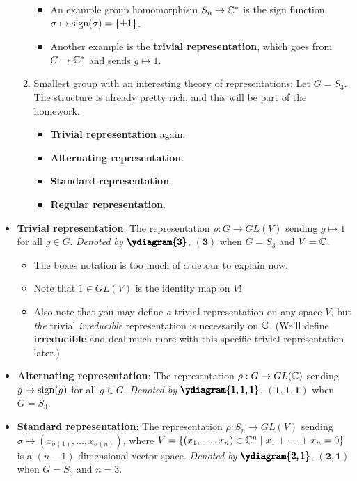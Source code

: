 \documentclass[../notes.tex]{subfiles}
\begin{document}
\begin{itemize}
\begin{enumerate}
\begin{itemize}
            \item An example group homomorphism $S_n\to\mathbb{C}^*$ is the sign function $\sigma\mapsto\operatorname{sign}(\sigma)=\{\pm 1\}$.
            \item Another example is the \textbf{trivial representation}, which goes from $G\to\mathbb{C}^*$ and sends $g\mapsto 1$.
        \end{itemize}
        \item Smallest group with an interesting theory of representations: Let $G=S_3$. The structure is already pretty rich, and this will be part of the homework.
        \begin{itemize}
            \item \textbf{Trivial representation} again.
            \item \textbf{Alternating representation}.
            \item \textbf{Standard representation}.
            \item \textbf{Regular representation}.
        \end{itemize}
    \end{enumerate}
    \item \textbf{Trivial representation}: The representation $\rho:G\to GL(V)$ sending $g\mapsto 1$ for all $g\in G$. \emph{Denoted by} $\pmb{\ydiagram{3}}$, $\bm{(3)}$ when $G=S_3$ and $V=\mathbb{C}$.
    \begin{itemize}
        \item The boxes notation is too much of a detour to explain now.
        \item Note that $1\in GL(V)$ is the identity map on $V$!
        \item Also note that you may define \emph{a} trivial representation on any space $V$, but \emph{the} trivial \emph{irreducible} representation is necessarily on $\mathbb{C}$. (We'll define \textbf{irreducible} and deal much more with this specific trivial representation later.)
    \end{itemize}
    \item \textbf{Alternating representation}: The representation $\rho:G\to GL(\mathbb{C})$ sending $g\mapsto\operatorname{sign}(g)$ for all $g\in G$. \emph{Denoted by} $\pmb{\ydiagram{1,1,1}}$, $\bm{(1,1,1)}$ when $G=S_3$.
    \item \textbf{Standard representation}: The representation $\rho:S_n\to GL(V)$ sending $\sigma\mapsto(x_{\sigma(1)},\dots,x_{\sigma(n)})$, where $V=\{(x_1,\dots,x_n)\in\mathbb{C}^n\mid x_1+\cdots+x_n=0\}$ is a $(n-1)$-dimensional vector space. \emph{Denoted by} $\pmb{\ydiagram{2,1}}$, $\bm{(2,1)}$ when $G=S_3$ and $n=3$.

\end{itemize}
\end{document}
